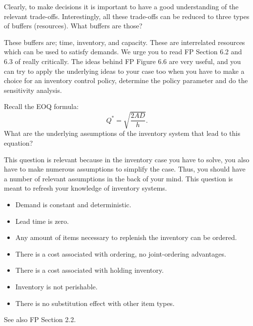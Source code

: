 \begin{question}
  Clearly, to make decisions it is important to have a good understanding
  of the relevant trade-offs. Interestingly, all these trade-offs can
  be reduced to three types of buffers (resources). What buffers are those?

\end{question}

  \begin{solution}
    These buffers are; time, inventory, and capacity. These are interrelated resources which can be used to satisfy demands. We urge you to read
    FP Section 6.2 and 6.3 of really critically. The ideas
    behind FP Figure 6.6 are very useful, and you can try to apply the
    underlying ideas to your case too when you have to make a choice
    for an inventory control policy, determine the policy parameter
    and do the sensitivity analysis.
  \end{solution}


\begin{question}\label{ex:1}
  Recall the EOQ formula:
  \begin{equation*}
    Q^* = \sqrt{\frac{ 2 A D}{h}}.
  \end{equation*}
What are the underlying assumptions of the inventory system that lead to this equation?

This question is relevant because in the inventory case you have to
solve, you also have to make numerous assumptions to simplify the
case. Thus, you should have a number of relevant assumptions in the
back of your mind.  This question is meant to refresh your knowledge
of inventory systems.
\end{question}

\begin{solution}
\begin{itemize}
\item Demand is constant and deterministic.
\item Lead time is zero.
\item Any amount of items necessary to replenish the inventory can be
  ordered.
\item There is a cost associated with ordering, no joint-ordering advantages.
\item There is a cost associated with holding inventory.
\item Inventory is not perishable.
\item There is no substitution effect with other item types.
\end{itemize}
See also FP Section 2.2.
\end{solution}

